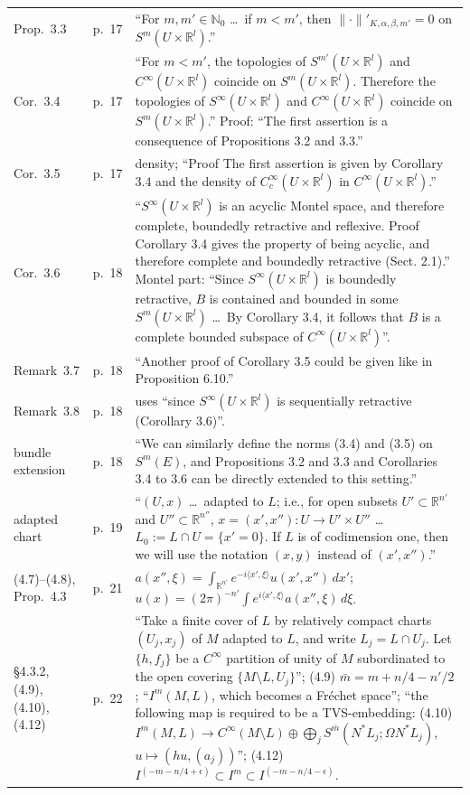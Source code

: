 \documentclass[11pt]{article}
\newcommand{\R}{\mathbb{R}}
\newcommand{\N}{\mathbb{N}}
\begin{document}
{\begin{longtable}{@{}p{}p{}p{}@{}}
Prop.~3.3 & p.~17 & ``For $m,m'\in\N_0$ \dots\ if $m<m'$, then $\|\cdot\|'_{K,\alpha,\beta,m'}=0$ on $S^m(U\times\R^l)$.''\\
Cor.~3.4 & p.~17 & ``For $m<m'$, the topologies of $S^{m'}(U\times\R^l)$ and $C^\infty(U\times\R^l)$ coincide on $S^m(U\times\R^l)$. Therefore the topologies of $S^\infty(U\times\R^l)$ and $C^\infty(U\times\R^l)$ coincide on $S^m(U\times\R^l)$.'' Proof: ``The first assertion is a consequence of Propositions 3.2 and 3.3.''\\
Cor.~3.5 & p.~17 & density; ``Proof The first assertion is given by Corollary 3.4 and the density of $C_c^\infty(U\times\R^l)$ in $C^\infty(U\times\R^l)$.''\\
Cor.~3.6 & p.~18 & ``$S^\infty(U\times\R^l)$ is an acyclic Montel space, and therefore complete, boundedly retractive and reflexive. Proof Corollary 3.4 gives the property of being acyclic, and therefore complete and boundedly retractive (Sect. 2.1).'' Montel part: ``Since $S^\infty(U\times\R^l)$ is boundedly retractive, $B$ is contained and bounded in some $S^m(U\times\R^l)$ \dots\ By Corollary 3.4, it follows that $B$ is a complete bounded subspace of $C^\infty(U\times\R^l)$''.\\
Remark~3.7 & p.~18 & ``Another proof of Corollary 3.5 could be given like in Proposition 6.10.''\\
Remark~3.8 & p.~18 & uses ``since $S^\infty(U\times\R^l)$ is sequentially retractive (Corollary 3.6)''.\\
bundle extension & p.~18 & ``We can similarly define the norms (3.4) and (3.5) on $S^m(E)$, and Propositions 3.2 and 3.3 and Corollaries 3.4 to 3.6 can be directly extended to this setting.''\\
adapted chart & p.~19 & ``$(U,x)$ \dots\ adapted to $L$; i.e., for open subsets $U'\subset\R^{n'}$ and $U''\subset\R^{n''}$, $x=(x',x'')\colon U\to U'\times U''$ \dots\ $L_0:=L\cap U=\{x'=0\}$. If $L$ is of codimension one, then we will use the notation $(x,y)$ instead of $(x',x'')$.''\\
(4.7)--(4.8), Prop.~4.3 & p.~21 & $a(x'',\xi)=\int_{\R^{n'}}e^{-i\langle x',\xi\rangle}u(x',x'')\,dx'$; $u(x)=(2\pi)^{-n'}\int e^{i\langle x',\xi\rangle}a(x'',\xi)\,d\xi$.\\
\S4.3.2, (4.9), (4.10), (4.12) & p.~22 & ``Take a finite cover of $L$ by relatively compact charts $(U_j,x_j)$ of $M$ adapted to $L$, and write $L_j=L\cap U_j$. Let $\{h,f_j\}$ be a $C^\infty$ partition of unity of $M$ subordinated to the open covering $\{M\setminus L,U_j\}$''; (4.9) $\bar m=m+n/4-n'/2$; ``$I^m(M,L)$, which becomes a Fr\'echet space''; ``the following map is required to be a TVS-embedding: (4.10) $I^m(M,L)\to C^\infty(M\setminus L)\oplus\bigoplus_jS^{\bar m}(N^*L_j;\Omega N^*L_j)$, $u\mapsto(hu,(a_j))$''; (4.12) $I^{(-m-n/4+\epsilon)}\subset I^m\subset I^{(-m-n/4-\epsilon)}$.\\

\end{longtable}}
\end{document}
